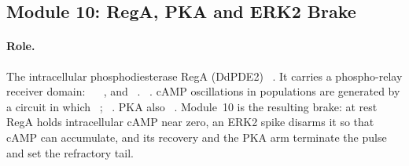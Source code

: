 \subsection{Module 10: RegA, PKA and ERK2 Brake}\label{sec:m10}

\paragraph{Role.}
The intracellular phosphodiesterase RegA (DdPDE2) ~\cite{bader2007}.
It carries a phospho-relay receiver domain: ~\cite{thomason1998,thomason1999} ~\cite{thomason1999}, and ~\cite{thomason1998}.
~\cite{shaulsky1998}.
cAMP oscillations in populations are generated by a circuit in which ~\cite{laub1998,maeda2004}; ~\cite{laub1998,maeda2004}.
PKA also ~\cite{aubry1997}.
Module~10 is the resulting brake: at rest RegA holds intracellular cAMP near zero, an ERK2 spike disarms it so that cAMP can accumulate, and its recovery and the PKA arm terminate the pulse and set the refractory tail.




